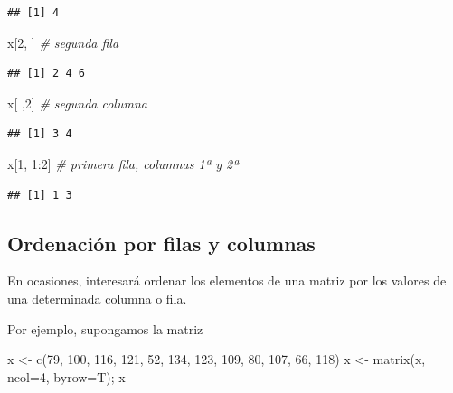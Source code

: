 \documentclass[
]{book}
\newenvironment{Shaded}{\begin{snugshade}}{\end{snugshade}}
\newcommand{\AttributeTok}[1]{\textcolor[rgb]{0.77,0.63,0.00}{#1}}
\newcommand{\CommentTok}[1]{\textcolor[rgb]{0.56,0.35,0.01}{\textit{#1}}}
\newcommand{\DecValTok}[1]{\textcolor[rgb]{0.00,0.00,0.81}{#1}}
\newcommand{\FunctionTok}[1]{\textcolor[rgb]{0.00,0.00,0.00}{#1}}
\newcommand{\NormalTok}[1]{#1}
\newcommand{\OtherTok}[1]{\textcolor[rgb]{0.56,0.35,0.01}{#1}}
\newcommand{\SpecialCharTok}[1]{\textcolor[rgb]{0.00,0.00,0.00}{#1}}
\theoremstyle{break}
\theoremstyle{nonumberplain}
\begin{document}
\begin{verbatim}
## [1] 4
\end{verbatim}

\begin{Shaded}
\begin{Highlighting}[]
\NormalTok{x[}\DecValTok{2}\NormalTok{, ]  }\CommentTok{\# segunda fila}
\end{Highlighting}
\end{Shaded}

\begin{verbatim}
## [1] 2 4 6
\end{verbatim}

\begin{Shaded}
\begin{Highlighting}[]
\NormalTok{x[ ,}\DecValTok{2}\NormalTok{]  }\CommentTok{\# segunda columna}
\end{Highlighting}
\end{Shaded}

\begin{verbatim}
## [1] 3 4
\end{verbatim}

\begin{Shaded}
\begin{Highlighting}[]
\NormalTok{x[}\DecValTok{1}\NormalTok{, }\DecValTok{1}\SpecialCharTok{:}\DecValTok{2}\NormalTok{]  }\CommentTok{\# primera fila, columnas 1ª y 2ª }
\end{Highlighting}
\end{Shaded}

\begin{verbatim}
## [1] 1 3
\end{verbatim}

\hypertarget{ordenaciuxf3n-por-filas-y-columnas}{%
\subsection{Ordenación por filas y columnas}\label{ordenaciuxf3n-por-filas-y-columnas}}

En ocasiones, interesará ordenar los elementos de una matriz por los valores de una determinada columna o fila.

Por ejemplo, supongamos la matriz

\begin{Shaded}
\begin{Highlighting}[]
\NormalTok{x }\OtherTok{\textless{}{-}} \FunctionTok{c}\NormalTok{(}\DecValTok{79}\NormalTok{, }\DecValTok{100}\NormalTok{, }\DecValTok{116}\NormalTok{, }\DecValTok{121}\NormalTok{, }\DecValTok{52}\NormalTok{, }\DecValTok{134}\NormalTok{, }\DecValTok{123}\NormalTok{, }\DecValTok{109}\NormalTok{, }\DecValTok{80}\NormalTok{, }\DecValTok{107}\NormalTok{, }\DecValTok{66}\NormalTok{, }\DecValTok{118}\NormalTok{)}
\NormalTok{x }\OtherTok{\textless{}{-}} \FunctionTok{matrix}\NormalTok{(x, }\AttributeTok{ncol=}\DecValTok{4}\NormalTok{, }\AttributeTok{byrow=}\NormalTok{T); x}
\end{Highlighting}
\end{Shaded}
\end{document}
